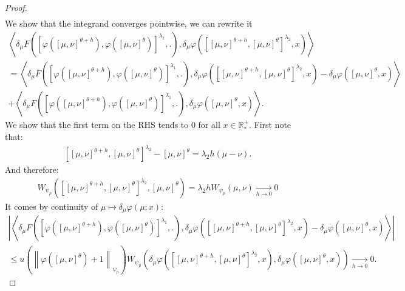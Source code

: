 \documentclass[11pt,a4paper]{article}
\newcommand{\RRP}{\mathbb{R}^+_*}
\newcommand{\brac}[1]{\left\langle#1\right\rangle}
\begin{document}
\begin{proof}
\begin{multline*}
    \end{multline*}
    We show that the integrand converges pointwise, we can rewrite it
    \begin{multline*}
        \brac{\delta_\mu F\left(\left[\varphi\left([\mu,\nu]^{\theta + h}\right),\varphi\left([\mu,\nu]^{\theta}\right)\right]^{\lambda_1}, . \right),\delta_\mu \varphi\left(\left[ [\mu,\nu]^{\theta + h}, [\mu,\nu]^{\theta }\right]^{\lambda_2} ,x\right)} \\
        = \brac{\delta_\mu F\left(\left[\varphi\left([\mu,\nu]^{\theta + h}\right),\varphi\left([\mu,\nu]^{\theta}\right)\right]^{\lambda_1}, . \right),\delta_\mu \varphi\left(\left[ [\mu,\nu]^{\theta + h}, [\mu,\nu]^{\theta }\right]^{\lambda_2} ,x\right) - \delta_\mu \varphi\left([\mu,\nu]^{\theta } ,x\right)} \\
        + \brac{\delta_\mu F\left(\left[\varphi\left([\mu,\nu]^{\theta + h}\right),\varphi\left([\mu,\nu]^{\theta}\right)\right]^{\lambda_1}, . \right) ,\delta_\mu \varphi\left([\mu,\nu]^{\theta } ,x\right)}.
    \end{multline*}
    We show that the first term on the RHS tends to $0$ for all $x \in \RRP$. First note that:
    \begin{align*}
        \left[ [\mu,\nu]^{\theta + h}, [\mu,\nu]^{\theta }\right]^{\lambda_2} - [\mu,\nu]^{\theta } = \lambda_2 h (\mu - \nu).
    \end{align*}
    And therefore:
    \begin{align*}
        W_{\psi_p}\left(\left[ [\mu,\nu]^{\theta + h}, [\mu,\nu]^{\theta }\right]^{\lambda_2},[\mu,\nu]^{\theta } \right) = \lambda_2 h W_{\psi_p}\left(\mu,\nu\right) \xrightarrow[h \to 0]{} 0
    \end{align*}
    It comes by continuity of $\mu \mapsto \delta_{\mu} \varphi(\mu;x)$:
    \begin{multline*}
        \left| \brac{\delta_\mu F\left(\left[\varphi\left([\mu,\nu]^{\theta + h}\right),\varphi\left([\mu,\nu]^{\theta}\right)\right]^{\lambda_1}, . \right),\delta_\mu \varphi\left(\left[ [\mu,\nu]^{\theta + h}, [\mu,\nu]^{\theta }\right]^{\lambda_2} ,x\right) - \delta_\mu \varphi\left([\mu,\nu]^{\theta } ,x\right)} \right|\\
        \leq u\left(\left\|\varphi\left([\mu,\nu]^{\theta }\right)+ 1\right\|_{\psi_p}\right) W_{\psi_p} \left(\delta_\mu \varphi\left(\left[ [\mu,\nu]^{\theta + h}, [\mu,\nu]^{\theta }\right]^{\lambda_2} ,x\right) , \delta_\mu \varphi\left([\mu,\nu]^{\theta } ,x\right) \right) 
        \xrightarrow[h \to 0]{} 0.
    \end{multline*}

\end{proof}
\end{document}
